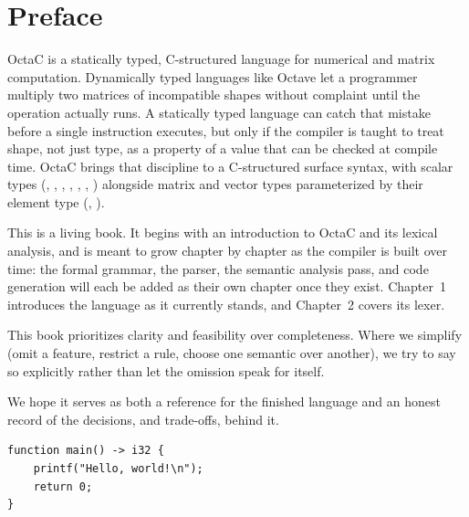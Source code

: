 \chapter*{Preface}

OctaC is a statically typed, C-structured language for numerical and
matrix computation. Dynamically typed languages like Octave
\cite{octave-manual} let a programmer multiply two matrices of incompatible
shapes without complaint until the operation actually runs. A statically
typed language can catch that mistake before a single instruction executes,
but only if the compiler is taught to treat shape, not just type, as a
property of a value that can be checked at compile time. OctaC brings that
discipline to a C-structured surface syntax, with scalar types (,
, , , , , )
alongside matrix and vector types parameterized by their element type
(, ).

This is a living book. It begins with an introduction to OctaC and its
lexical analysis, and is meant to grow chapter by chapter as the compiler is
built over time: the formal grammar, the parser, the semantic analysis pass,
and code generation will each be added as their own chapter once they exist.
Chapter~1 introduces the language as it currently stands, and Chapter~2
covers its lexer.

This book prioritizes clarity and feasibility over completeness. Where we
simplify (omit a feature, restrict a rule, choose one semantic
over another), we try to say so explicitly rather than let the omission
speak for itself.

We hope it serves as both a reference for the finished language and an
honest record of the decisions, and trade-offs, behind it.

\begin{lstlisting}[breaklines=true]
function main() -> i32 {
    printf("Hello, world!\n");
    return 0;
}
\end{lstlisting}
